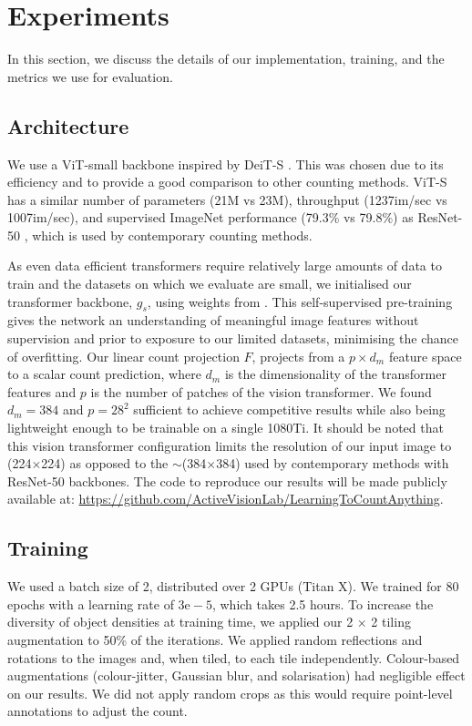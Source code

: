 \documentclass[letterpaper, 11pt]{IEEEtran}
\begin{document}
\section{Experiments}
\label{experiments}
In this section, we discuss the details of our implementation, training, and the metrics we use for evaluation.
\subsection{Architecture}
\label{experiments_implementationdetails}
We use a ViT-small backbone inspired by DeiT-S \cite{touvron2021training}. This was chosen due to its efficiency and to provide a good comparison to other counting methods.
ViT-S has a similar number of parameters (21M vs 23M), throughput (1237im/sec vs 1007im/sec), and supervised ImageNet performance (79.3\% vs 79.8\%) as ResNet-50 \cite{touvron2021training}, which is used by contemporary counting methods.

As even data efficient transformers require relatively large amounts of data to train and the datasets on which we evaluate are small, we initialised our transformer backbone, $g_s$, using weights from \citet{caron2021DINO}. This self-supervised pre-training gives the network an understanding of meaningful image features without supervision and prior to exposure to our limited datasets, minimising the chance of overfitting. 
Our linear count projection $F$, projects from a $p\times d_m$ feature space to a scalar count prediction,
where $d_m$ is the dimensionality of the transformer features and $p$ is the number of patches of the vision transformer. We found $d_m = 384$ and $p = 28^2$ sufficient to achieve competitive results while also being lightweight enough to be trainable on a single 1080Ti. It should be noted that this vision transformer configuration limits the resolution of our input image to (224$\times$224) as opposed to the $\sim$(384$\times$384) used by contemporary methods with ResNet-50 backbones.
The code to reproduce our results will be made publicly available at: \url{https://github.com/ActiveVisionLab/LearningToCountAnything}.

\subsection{Training}
\label{experiments_training}
We used a batch size of 2, distributed over 2 GPUs (Titan X). We trained for 80 epochs with a learning rate of $3\mathrm{e}-5$, which takes 2.5 hours.
To increase the diversity of object densities 
at training time, we applied our 2 × 2 tiling augmentation to 50\% of the iterations.
We applied random reflections and rotations to the images and, when tiled, to each tile independently. Colour-based augmentations (colour-jitter, Gaussian blur, and solarisation) had negligible effect on our results. We did not apply random crops as this would require point-level annotations to adjust the count. 
\end{document}
